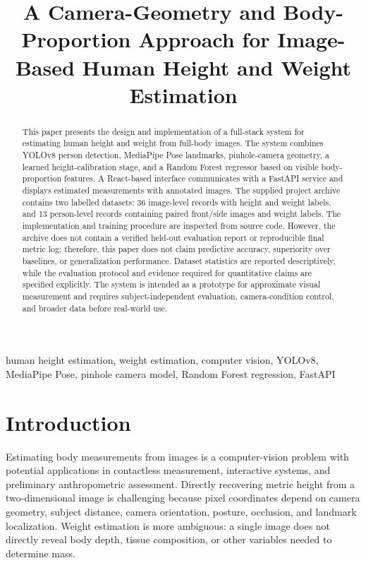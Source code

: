\documentclass[conference]{IEEEtran}
\title{A Camera-Geometry and Body-Proportion Approach for Image-Based Human Height and Weight Estimation}
\author{
\IEEEauthorblockN{Author Name 1, Author Name 2, Author Name 3}
\IEEEauthorblockA{\textit{School/Department of Department Name}\\
\textit{Institution Name}\\
City, Country\\
author email(s)}
}
\begin{document}
\maketitle

\begin{abstract}
This paper presents the design and implementation of a full-stack system for estimating human height and weight from full-body images. The system combines YOLOv8 person detection, MediaPipe Pose landmarks, pinhole-camera geometry, a learned height-calibration stage, and a Random Forest regressor based on visible body-proportion features. A React-based interface communicates with a FastAPI service and displays estimated measurements with annotated images. The supplied project archive contains two labelled datasets: 36 image-level records with height and weight labels, and 13 person-level records containing paired front/side images and weight labels. The implementation and training procedure are inspected from source code. However, the archive does not contain a verified held-out evaluation report or reproducible final metric log; therefore, this paper does not claim predictive accuracy, superiority over baselines, or generalization performance. Dataset statistics are reported descriptively, while the evaluation protocol and evidence required for quantitative claims are specified explicitly. The system is intended as a prototype for approximate visual measurement and requires subject-independent evaluation, camera-condition control, and broader data before real-world use.
\end{abstract}

\begin{IEEEkeywords}
human height estimation, weight estimation, computer vision, YOLOv8, MediaPipe Pose, pinhole camera model, Random Forest regression, FastAPI
\end{IEEEkeywords}

\section{Introduction}
Estimating body measurements from images is a computer-vision problem with potential applications in contactless measurement, interactive systems, and preliminary anthropometric assessment. Directly recovering metric height from a two-dimensional image is challenging because pixel coordinates depend on camera geometry, subject distance, camera orientation, posture, occlusion, and landmark localization. Weight estimation is more ambiguous: a single image does not directly reveal body depth, tissue composition, or other variables needed to determine mass.
\end{document}
